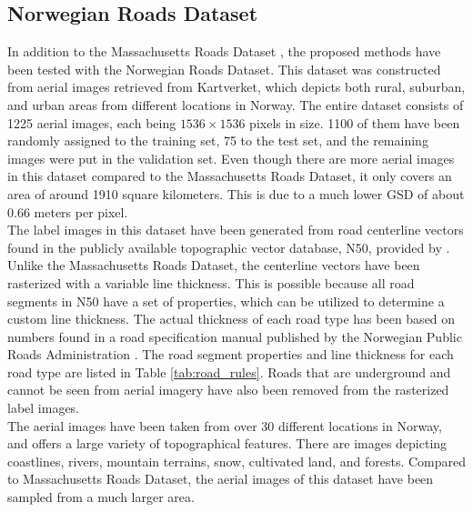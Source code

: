 
\subsection{Norwegian Roads Dataset}
In addition to the Massachusetts Roads Dataset \citep{MnihThesis}, the proposed methods have been tested with the Norwegian Roads Dataset. This dataset was constructed from aerial images retrieved from Kartverket, which depicts both rural, suburban, and urban areas from different locations in Norway. The entire dataset consists of 1225 aerial images, each being $1536\times 1536$ pixels in size. 1100 of them have been randomly assigned to the training set, 75 to the test set, and the remaining images were put in the validation set. Even though there are more aerial images in this dataset compared to the Massachusetts Roads Dataset, it only covers an area of around 1910 square kilometers. This is due to a much lower \ac{GSD} of about 0.66 meters per pixel. \\


The label images in this dataset have been generated from road centerline vectors found in the publicly available topographic vector database, N50, provided by \cite{Kartverket}. Unlike the Massachusetts Roads Dataset, the centerline vectors have been rasterized with a variable line thickness. This is possible because all road segments in N50 have a set of properties, which can be utilized to determine a custom line thickness. The actual thickness of each road type has been based on numbers found in a road specification manual published by the Norwegian Public Roads Administration \citep{Norwegian_road_manual}. The road segment properties and line thickness for each road type are listed in Table \ref{tab:road_rules}. Roads that are underground and cannot be seen from aerial imagery have also been removed from the rasterized label images.\\

The aerial images have been taken from over 30 different locations in Norway, and offers a large variety of topographical features. There are images depicting coastlines, rivers, mountain terrains, snow, cultivated land, and forests. Compared to Massachusetts Roads Dataset, the aerial images of this dataset have been sampled from a much larger area. \\

